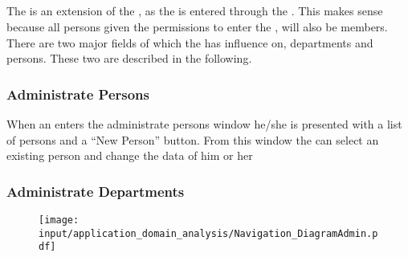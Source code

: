 \subsection{\ainterface}
\label{sec:admininterface}

The \ainterface[] is an extension of the \sinterface[], as the \ainterface[] is entered through the \sinterface[].
This makes sense because all persons given the permissions to enter the \ainterface[], will also be \astaff[] members.
There are two major fields of which the \admin[] has influence on, departments and persons.
These two are described in the following.

\subsubsection{Administrate Persons}
When an \admin[] enters the administrate persons window he/she is presented with a list of persons and a ``New Person'' button.
From this window the \admin[] can select an existing person and change the data of him or her 

\subsubsection{Administrate Departments}



\begin{figure}[htbp]
	\centering
		\texttt{[image: input/application\_domain\_analysis/Navigation\_DiagramAdmin.pdf]}
	\morscaption{\ainterface[c]}
	\label{fig:Navigation_DiagramStaff}
\end{figure}

\begin{comment}
\begin{itemize}
	\item department, including:
	\begin{itemize}
		\item categories
		\item tags
	\end{itemize}
	\item persons
\end{itemize}
\end{comment}